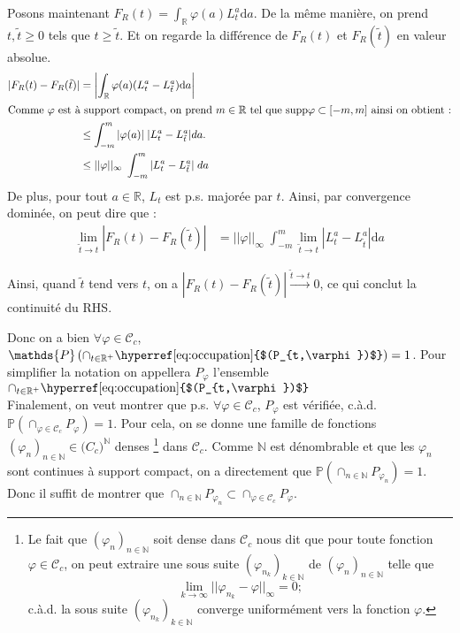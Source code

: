 \documentclass[openany]{book}
\makeatletter
\renewcommand{\P}{\mathds{P}}
\newcommand{\R}{\mathbb{R}}
\newcommand{\1}{\mathbbm{1}}
\newcommand{\supp}{\text{supp}}
\newcommand{\refocc}{\hyperref[eq:occupation]{$(P_{t,\varphi})$}}
\renewcommand{\d}{\mathrm{d}}
\renewenvironment{proof}[1][\textbf{\textit{Démonstration}}]{%
  \par\pushQED{\qed}%
  \normalfont\topsep6\p@\@plus6\p@\relax
  \trivlist\item[\hskip\labelsep
    #1\@addpunct{.}]\ignorespaces
}{%
  \popQED\endtrivlist\@endpefalse
}
\theoremstyle{thmfont}
\theoremstyle{deffont}
\theoremstyle{thmfont}
\theoremstyle{deffont}
\makeatother
\begin{document}
\begin{proof}
\begin{itemize}
    Posons maintenant $F_R(t) = \int_\R \varphi(a) L_t^a\d a$. De la même manière, on prend $t, \tilde{t} \geq 0$ tels que $t \geq \tilde{t}$. Et on regarde la différence de $F_R(t)$ et $F_R(\tilde{t})$ en valeur absolue.
    \begin{align*}
      |F_R(t) - F_R(\tilde{t})| &= \left|\int_\R \varphi(a) (L_t^a - L_{\tilde{t}}^a)\d a\right|\\
      \shortintertext{Comme $\varphi$ est à support compact, on prend $m \in \R$ tel que $\supp{\varphi} \subset[-m,m]$ ainsi on obtient :}
                                &\leq \int_{-m}^m |\varphi(a)|\; |L_t^a - L_{\tilde{t}}^a|da.\\
                                & \leq ||\varphi||_\infty\; \int_{-m}^m |L_t^a - L_{\tilde t}^a|\;da
\end{align*}
De plus, pour tout $a \in \R$, $L_t$ est p.s. majorée par $t$. Ainsi, par convergence dominée, on peut dire que :
\begin{align*}
  \lim_{\tilde t \to t}|F_R(t) - F_R(\tilde{t})| %
                                               &= ||\varphi||_\infty\;\int_{-m}^{m} \lim_{\tilde t \to t} |L_t^a - L_{\tilde t}^a |\d a
    \end{align*}

    Ainsi, quand $\tilde{t}$ tend vers $t$, on a $|F_R(t) - F_R(\tilde{t})| \xrightarrow{\tilde t \to t} 0$, ce qui conclut la continuité du RHS.
    \end{itemize}
    Donc on a bien $\forall \varphi \in \mathcal C_c$, $\P\left(\cap_{t\in \R^+} \text{\refocc}\right) = 1$. Pour simplifier la notation on appellera $P_\varphi$ l'ensemble $\cap_{t\in \R^+} \text{\refocc}$\\

    Finalement, on veut montrer que p.s. $\forall \varphi \in \mathcal C_c$, $P_\varphi$ est vérifiée, c.à.d. $\P(\cap_{\varphi \in \mathcal C_c} P_\varphi) = 1$. Pour cela, on se donne une famille de fonctions $(\varphi_n)_{n\in \mathbb N} \in \mathcal (C_c)^{\mathbb N}$ denses
 \footnote{Le fait que $(\varphi_n)_{n\in\mathbb{N}}$ soit dense dans $\mathcal C_c$ nous dit que pour toute fonction $\varphi \in \mathcal C_c$, on peut extraire une sous suite $(\varphi_{n_k})_{k\in \mathbb{N}}$ de $(\varphi_n)_{n\in\mathbb{N}}$ telle que $$\lim_{k \to \infty}||\varphi_{n_k} - \varphi||_\infty = 0;$$ c.à.d. la sous suite $(\varphi_{n_k})_{k\in\mathbb{N}}$ converge uniformément vers la fonction $\varphi$. }
 dans $\mathcal C_c$. Comme $\mathbb N$ est dénombrable et que les $\varphi_n$ sont continues à support compact, on a directement que $\P(\cap_{n\in \mathbb N}P_{\varphi_n})=1$. Donc il suffit de montrer que $\cap_{n\in \mathbb N} P_{\varphi_n} \subset \cap_{\varphi \in \mathcal C_c} P_\varphi$.


\end{proof}
\end{document}
